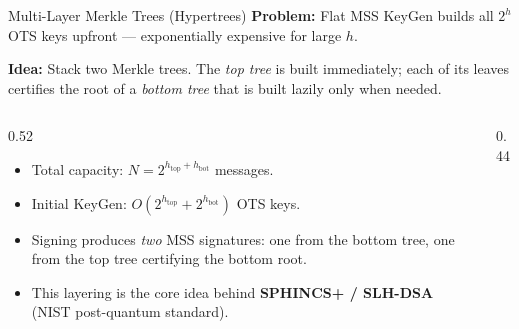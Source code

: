 \documentclass[aspectratio=169, 10pt]{beamer}
\begin{document}
\begin{frame}{Multi-Layer Merkle Trees (Hypertrees)}
\textbf{Problem:} Flat MSS KeyGen builds all $2^h$ OTS keys upfront --- exponentially expensive for large $h$.

\vspace{6pt}
\textbf{Idea:} Stack two Merkle trees. The \emph{top tree} is built immediately; each of its leaves certifies the root of a \emph{bottom tree} that is built \alert{lazily} only when needed.

\begin{columns}
\begin{column}{0.52\textwidth}
\begin{itemize}
    \item Total capacity: $N = 2^{h_{\text{top}} + h_{\text{bot}}}$ messages.
    \item Initial KeyGen: $O(2^{h_{\text{top}}} + 2^{h_{\text{bot}}})$ OTS keys.
    \item Signing produces \emph{two} MSS signatures: one from the bottom tree, one from the top tree certifying the bottom root.
    \item This layering is the core idea behind \textbf{SPHINCS+ / SLH-DSA} (NIST post-quantum standard).
\end{itemize}
\end{column}
\begin{column}{0.44\textwidth}
\centering
{}
\end{column}
\end{columns}
\end{frame}
\end{document}
